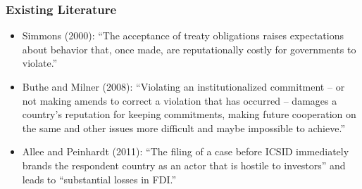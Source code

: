 \documentclass[10pt]{beamer}
\begin{document}
\begin{frame}
\frametitle{Existing Literature}

\begin{itemize}
	\item Simmons (2000): ``The acceptance of treaty obligations raises expectations about behavior that, once made, are reputationally costly for governments to violate.'' 
	\item Buthe and Milner (2008): ``Violating an institutionalized commitment – or not making amends to correct a violation that has occurred – damages a country's reputation for keeping commitments, making future cooperation on the same and other issues more difficult and maybe impossible to achieve.'' 
	\item Allee and Peinhardt (2011): ``The filing of a case before ICSID immediately brands the respondent country as an actor that is hostile to investors'' and leads to ``substantial losses in FDI.''
\end{itemize}



\end{frame}
\end{document}
